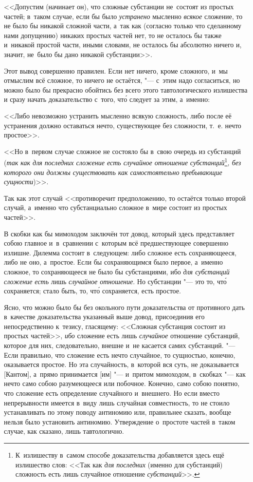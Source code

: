 <<Допустим (начинает он), что сложные субстанции не~состоят из простых частей;
в~таком случае, если бы было {\em устранено} мысленно {\em всякое} сложение, то
не было бы никакой сложной части, а~так как (согласно только что сделанному
нами допущению) никаких простых частей нет, то не осталось бы также и~никакой
простой части, иными словами, не осталось бы абсолютно ничего и, значит,
не~было бы дано никакой субстанции>>.

Этот вывод совершенно правилен. Если нет ничего, кроме сложного, и~мы
отмыслим всё сложное, то ничего не остаётся, "--- с~этим надо согласиться, но
можно было бы прекрасно обойтись без всего этого тавтологического излишества
и сразу начать доказательство с~того, чт\'{о} следует за этим, а~именно:

<<Либо невозможно устранить мысленно всякую сложность, либо после её устранения
должно оставаться нечто, существующее без сложности, т.~е. нечто простое>>.

<<Но в~первом случае сложное не состояло бы в~свою очередь из субстанций
({\em так как для последних сложение есть случайное
отношение субстанций}\footnote{К~излишеству в~самом способе
доказательства добавляется здесь ещё излишество слов: <<Так как
{\em для последних} (именно для субстанций) сложность есть лишь случайное
отношение {\em субстанций}>>.}{\em , без которого они должны
существовать как самостоятельно пребывающие сущности})>>.

Так как этот случай <<противоречит предположению, то остаётся
только второй случай, а~именно что субстанциально
сложное в~мире состоит из простых частей>>.

В скобки как бы мимоходом заключён тот довод, который здесь представляет
собою главное и~в~сравнении с~которым всё предшествующее совершенно излишне.
Дилемма состоит в~следующем: либо сложное есть сохраняющееся, либо не оно,
а~простое. Если бы сохраняющимся было первое, а~именно сложное,
то сохраняющееся не было бы субстанциями, ибо {\em для субстанций
сложение есть} лишь {\em случайное отношение}. Но субстанции "--- это то,
чт\'{о} сохраняется; стало быть, то, чт\'{о} сохраняется, есть простое.

Ясно, что можно было бы без окольного пути доказательства от противного дать
в~качестве доказательства указанный выше довод, присоединив его
непосредственно к~тезису, гласящему: <<Сложная субстанция состоит из простых
частей>>, {\em ибо} сложение есть лишь {\em случайное} отношение субстанций,
которое для них, следовательно, внешне и~не касается самих субстанций. "---
Если правильно, что сложение есть нечто случайное, то сущностью, конечно,
оказывается простое. Но эта случайность, в~которой вся суть, не доказывается
[Кантом], а~прямо принимается [им] "--- и~притом мимоходом, в~скобках "--- как
нечто само собою разумеющееся или побочное. Конечно, само собою понятно, что
сложение есть определение случайного и~внешнего. Но если вместо непрерывности
имеется в~виду лишь случайная совместность, то не стоило устанавливать
по этому поводу антиномию или, правильнее сказать, вообще нельзя было
установить антиномию. Утверждение о~простоте частей в~таком случае,
как сказано, лишь тавтологично.

